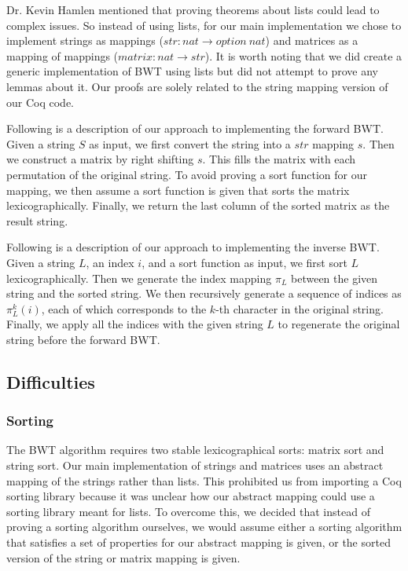 \documentclass[11pt,letterpaper,titlepage]{article}
\begin{document}
Dr. Kevin Hamlen mentioned that proving theorems about lists could lead to
complex issues. So instead of using lists, for our main implementation we chose
to implement strings as mappings ($str: nat \rightarrow option\ nat$) and
matrices as a mapping of mappings ($matrix: nat \rightarrow str$). It is worth
noting that we did create a generic implementation of BWT using lists but did
not attempt to prove any lemmas about it. Our proofs are solely related to the
string mapping version of our Coq code.

Following is a description of our approach to implementing the forward BWT.
Given a string $S$ as input, we first convert the string into a $str$ mapping
$s$. Then we construct a matrix by right shifting $s$. This fills the matrix
with each permutation of the original string. To avoid proving a sort function
for our mapping, we then assume a sort function is given that sorts the matrix
lexicographically. Finally, we return the last column of the sorted matrix as
the result string.

Following is a description of our approach to implementing the inverse BWT.
Given a string $L$, an index $i$, and a sort function as input, we first sort
$L$ lexicographically. Then we generate the index mapping $\pi_L$ between the
given string and the sorted string. We then recursively generate a sequence of
indices as $\pi_L^k(i)$, each of which corresponds to the $k$-th character in
the original string. Finally, we apply all the indices with the given string
$L$ to regenerate the original string before the forward BWT.

\subsection{Difficulties}

\subsubsection{Sorting}

The BWT algorithm requires two stable lexicographical sorts: matrix sort and
string sort. Our main implementation of strings and matrices uses an abstract
mapping of the strings rather than lists. This prohibited us from importing a
Coq sorting library because it was unclear how our abstract mapping could use a
sorting library meant for lists. To overcome this, we decided that instead of
proving a sorting algorithm ourselves, we would assume either a sorting
algorithm that satisfies a set of properties for our abstract mapping is given,
or the sorted version of the string or matrix mapping is given.
\end{document}
